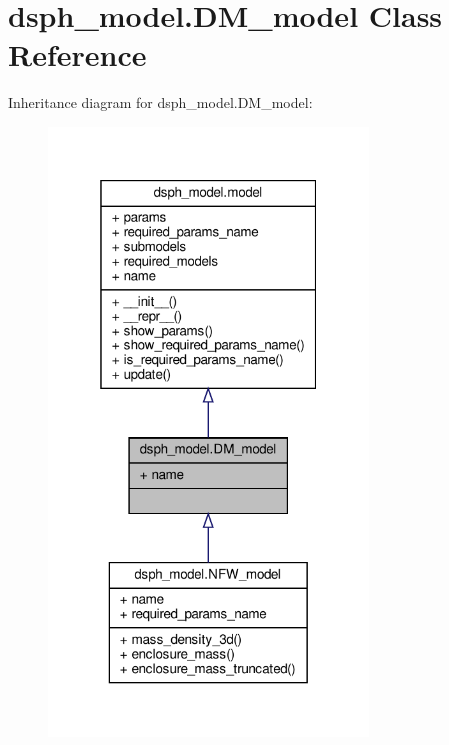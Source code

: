 \hypertarget{classdsph__model_1_1DM__model}{}\section{dsph\+\_\+model.\+D\+M\+\_\+model Class Reference}
\label{classdsph__model_1_1DM__model}


Inheritance diagram for dsph\+\_\+model.\+D\+M\+\_\+model\+:\nopagebreak
\begin{figure}[H]
\begin{center}
\leavevmode
\includegraphics[width=241pt]{db/da8/classdsph__model_1_1DM__model__inherit__graph}
\end{center}
\end{figure}



